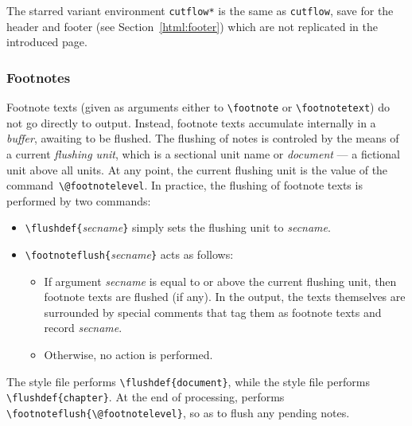 The starred variant environment
\verb+cutflow*+ is the same
as \verb+cutflow+, save for the \html{} header and footer (see
Section~\ref{html:footer}) which are not replicated in the introduced
page.


\subsubsection{Footnotes\label{hachafoot}}
%
%
Footnote texts (given as arguments either to \verb+\footnote+ or
\verb+\footnotetext+) do not go directly to output.
Instead, footnote texts accumulate internally in a \emph{buffer},
awaiting to be flushed.
The flushing of notes is controled by the means of a current
\emph{flushing unit}, which is a sectional unit name or
\textit{document} --- a fictional unit above all units.
At any point, the current flushing unit is the value of the
command~\verb+\@footnotelevel+.
In practice, the flushing of footnote texts is performed by two commands:
\begin{itemize}
\item \verb+\flushdef{+\textit{secname}\verb+}+ simply sets
the flushing unit to \textit{secname}.
\item \verb+\footnoteflush{+\textit{secname}\verb+}+ acts
as follows:
\begin{itemize}
\item If argument \textit{secname} is equal to or above the
current flushing unit, then footnote texts are flushed (if any).
In the output, the texts themselves are surrounded by special comments
that tag them as footnote texts and record \textit{secname}.
\item Otherwise, no action is performed.
\end{itemize}
\end{itemize}
The  style file performs \verb+\flushdef{document}+,
while the  style file performs  \verb+\flushdef{chapter}+.
At the end of processing, \verb++ performs
\verb+\footnoteflush{\@footnotelevel}+, so as to flush any pending notes.


